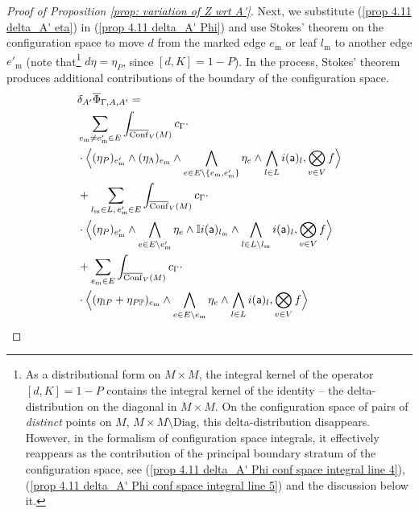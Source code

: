 \documentclass[11pt,a4paper]{amsart}
\theoremstyle{plain} %
\theoremstyle{definition}
\theoremstyle{remark}
\newcommand{\mr}{\mathrm}
\newcommand{\sfa}{\mathsf{a}}
\newcommand{\mm}{\mathrm{m}}
\newcommand{\Conf}[1][V]{\overline{\mathrm{Conf}}_#1(M)}
\newcommand{\II}{\mathbb{I}}
\newcommand{\PP}{\mathbb{P}}
\begin{document}
{\begin{proof}[%
Proof of Proposition \ref{prop: variation of Z wrt A'}]
Next, we substitute (\ref{prop 4.11 delta_A' eta}) in (\ref{prop 4.11 delta_A' Phi}) and use Stokes' theorem on the configuration space to move $d$ from the marked edge $e_\mm$ or leaf $l_\mm$ to another edge $e'_\mm$ (note that\footnote{\label{footnote: 1 as principal boundary stratum}
As a distributional form on $M\times M$, the integral kernel of the operator $[d,K]=1-P$ contains the integral kernel of the identity -- the delta-distribution on the diagonal in $M\times M$. On the  configuration space of pairs of \emph{distinct} points on $M$, ${M\times M\setminus \mr{Diag}}$, this delta-distribution disappears. However, in the formalism of configuration space integrals, it effectively reappears as the contribution of the principal boundary stratum of the configuration space, see (\ref{prop 4.11 delta_A' Phi conf space integral line 4}), (\ref{prop 4.11 delta_A' Phi conf space integral line 5}) and the discussion below it.
} $d\eta=\eta_P$, since $[d,K]=1-P$). In the process, Stokes' theorem produces additional contributions of the boundary of the configuration space.%
\begin{align}%
    &\delta_{A'}  \overline\Phi_{\Gamma,A,A'}=  \notag \\ 
    \label{prop 4.11 delta_A' Phi conf space integral line 1}
    &
    \sum_{e_\mm\neq e'_\mm\in E}\int_{\Conf} c_\Gamma \cdot \\ 
    \notag
    &\cdot \Big\langle (\eta_P)_{e'_\mm}\wedge (\eta_\Lambda)_{e_\mm}\wedge  \bigwedge_{e\in E\setminus\{e_\mm,e'_\mm\}}\eta_e \wedge \bigwedge_{l\in L} i(\sfa)_l,\bigotimes_{v\in V} f  \Big\rangle\\
    \label{prop 4.11 delta_A' Phi conf space integral line 2}
    &
    +\sum_{l_\mm\in L,\, e'_\mm\in E} \int_{\Conf} c_\Gamma \cdot \\ 
    \notag &\cdot
    \Big\langle  (\eta_P)_{e'_\mm} \wedge \bigwedge_{e\in E\setminus e'_\mm}\eta_e \wedge \II i(\sfa)_{l_\mm}\wedge \bigwedge_{l\in L\setminus l_\mm} i(\sfa)_l, \bigotimes_{v\in V} f\Big\rangle\\
    \label{prop 4.11 delta_A' Phi conf space integral line 3}
    &
    +\sum_{e_\mm\in E} \int_{\Conf} c_\Gamma \cdot \\ 
    \notag
    &\cdot \Big\langle (\eta_{\II P}+\eta_{P\PP})_{e_\mm}\wedge\bigwedge_{e\in E\setminus e_\mm}\eta_e\wedge \bigwedge_{l\in L}i(\sfa)_l,\bigotimes_{v\in V} f \Big\rangle\\

\end{align}
\end{proof}}
\end{document}
